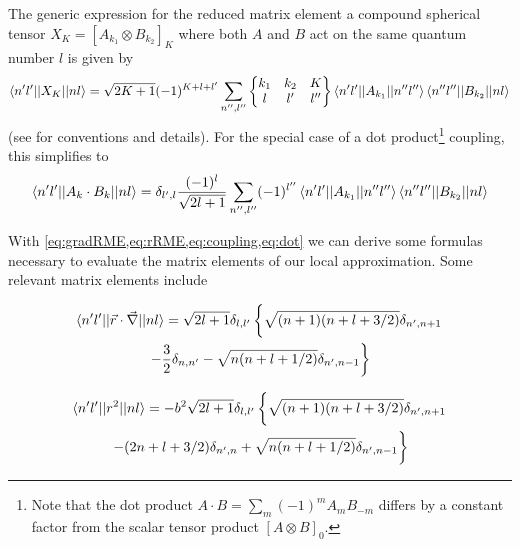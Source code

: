 The generic expression for the reduced matrix element a compound spherical tensor $X_K=\left[A_{k_1}\otimes B_{k_2}\right]_K$  where both $A$ and $B$ act on the same quantum number $l$ is given by 
\begin{equation}\label{eq:coupling}
\braket{n' l' || X_K || nl}=\sqrt{2K+1}(-1)^{K+l+l'}\sum_{n'',l''}\begin{Bmatrix} k_1 & k_2 & K \\ l & l' & l'' \end{Bmatrix}\braket{n' l' || A_{k_1} || n'' l''}\braket{n'' l'' || B_{k_2} || n l}
\end{equation}
(see \cite{Edmonds} for conventions and details). For the special case of a dot product\footnote{Note that the dot product $A\cdot B=\sum_m (-1)^m A_m B_{-m}$ differs by a constant factor from the scalar tensor product $[A\otimes B]_0$.} coupling, this simplifies to
\begin{equation}\label{eq:dot}
\braket{n' l' || A_{k}\cdot B_k || nl}=\delta_{l',l}\frac{(-1)^l}{\sqrt{2l+1}}\sum_{n'',l''}(-1)^{l''}\braket{n' l' || A_{k_1} || n'' l''}\braket{n'' l'' || B_{k_2} || n l}
\end{equation}

With \cref{eq:gradRME,eq:rRME,eq:coupling,eq:dot} we can derive some formulas necessary to evaluate the matrix elements of our local approximation. Some relevant matrix elements include

\begin{multline}
\braket{n'l' || \vec{r}\cdot\vec{\nabla} || nl } = \sqrt{2l+1}\delta_{l,l'}\left\{\sqrt{(n+1)(n+l+3/2)}\delta_{n',n+1}\vphantom{\frac{1}{2}} \right.\\
\left.-\frac{3}{2}\delta_{n,n'}-\sqrt{n(n+l+1/2)}\delta_{n',n-1}\right\}
\end{multline}

\begin{multline}
\braket{n'l' || r^2  || nl } =  -b^2 \sqrt{2l+1}\delta_{l,l'}\left\{\sqrt{(n+1)(n+l+3/2)}\delta_{n',n+1} \vphantom{\frac{1}{1}} \right.\\
\left.-(2n+l+3/2)\delta_{n',n}+\sqrt{n(n+l+1/2)}\delta_{n',n-1}\vphantom{\frac{1}{1}} \right\}
\end{multline}

